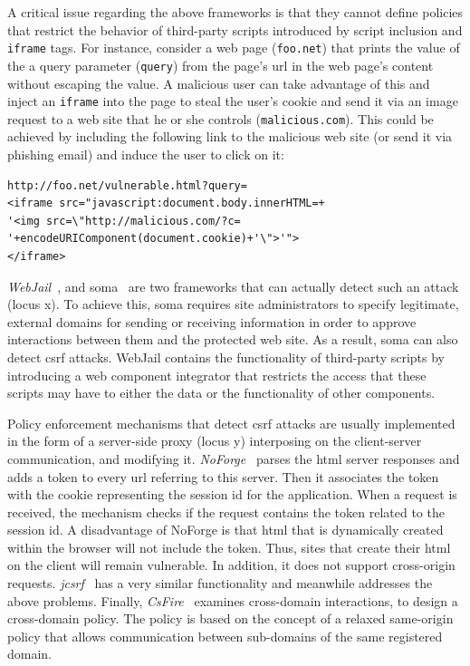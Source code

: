 \documentclass[conference]{IEEEtran}
\begin{document}
A critical issue regarding
the above frameworks is that they cannot
define policies that restrict the behavior of third-party
scripts introduced by script inclusion and {\tt iframe}
tags. For instance, consider a web page ({\tt foo.net})
that prints the value of the a query parameter ({\tt query})
from the page's {\sc url} in the web page's content
without escaping the value. A malicious user
can take advantage of this and inject an {\tt iframe}
into the page to steal the user's cookie and
send it via an image request to a web site
that he or she controls ({\tt malicious.com}).
This could be achieved by including the following
link to the malicious web site (or send it via phishing
email) and induce the user to click on it:

\lstset{language=VBScript, basicstyle=\footnotesize\ttfamily,}
\begin{lstlisting}
http://foo.net/vulnerable.html?query=
<iframe src="javascript:document.body.innerHTML=+
'<img src=\"http://malicious.com/?c=
'+encodeURIComponent(document.cookie)+'\">'">
</iframe>
\end{lstlisting}

\noindent
{\it WebJail}~\cite{VDDPJ11}, and
{\sc soma}~\cite{OWVS08} are two frameworks that
can actually detect such an attack (locus {\sc x}).
To achieve this, {\sc soma} requires site administrators
to specify legitimate, external domains for sending
or receiving information in order to approve interactions
between them and the protected web site. As a result,
{\sc soma} can also detect {\sc csrf} attacks.
WebJail contains the functionality of third-party scripts
by introducing a web component integrator that restricts
the access that these scripts may have to either the data
or the functionality of other components.

Policy enforcement mechanisms that detect {\sc csrf}
attacks are usually implemented in the form of a
server-side proxy (locus {\sc y})
interposing on the client-server communication, and modifying
it. {\it NoForge}~\cite{JKK06a}
parses the {\sc html} server responses
and adds a token to every {\sc url} referring to this
server. Then it associates the token with the cookie
representing the session {\sc id} for the application.
When a request is received, the mechanism checks
if the request contains the token related
to the session {\sc id}. A disadvantage of NoForge
is that {\sc html} that is dynamically created within
the browser will not include the token.
Thus, sites that create their {\sc html} on the client
will remain vulnerable. In addition, it does not
support cross-origin requests.
{\it j{\sc csrf}}~\cite{PS11}
has a very similar functionality and meanwhile
addresses the above problems.
Finally, {\it CsFire}~\cite{DDHPJ10}
examines cross-domain interactions,
to design a cross-domain policy.
The policy is based on the concept of a relaxed
same-origin policy that allows communication between
sub-domains of the same registered domain.
\end{document}
